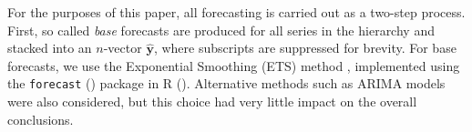 \documentclass[a4paper,review,12pt,authoryear]{elsarticle}
\let\code=\texttt
\begin{document}

For the purposes of this paper, all forecasting is carried out as a two-step process. First, so called \textit{base} forecasts are produced for all series in the hierarchy and stacked into an $n$-vector $\hat{\bm{y}}$, where subscripts are suppressed for brevity. For base forecasts, we use the Exponential Smoothing (ETS) method \citep{ForecastingExponentialSmoothing}, implemented using the \code{forecast} (\citealp{forecast}) package in {R} (\citealp{R}). Alternative methods such as ARIMA models were also considered, but this choice had very little impact on the overall conclusions. 
\end{document}
